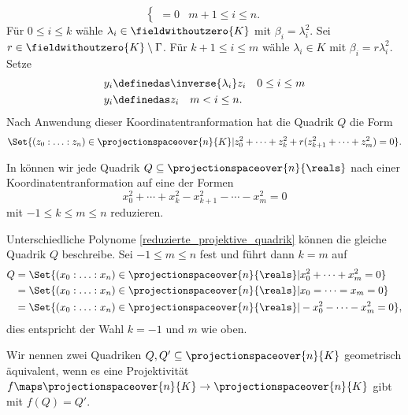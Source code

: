 \begin{beispiel*}
\begin{equation*}
\begin{cases}
      =0 &m+1\leq i\leq n.
    \end{cases}
  \end{equation*}
  Für \( 0\leq i\leq k \) wähle \( \lambda_i\in \fieldwithoutzero{K} \) mit \( \beta_i=\lambda_i^2 \). Sei \( r\in \fieldwithoutzero{K}\setminus \Gamma \). Für \( k+1\leq i\leq m\) wähle \( \lambda_i\in K \) mit \( \beta_i=r\lambda_i^2 \). Setze
  \begin{align*}
    y_i&\definedas \inverse{\lambda_i}z_i\quad 0\leq i\leq m\\
    y_i&\definedas z_i\quad m<i\leq n.
  \end{align*}
  Nach Anwendung dieser Koordinatentranformation hat die Quadrik \( Q \) die Form
  \begin{equation*}
    \Set{(z_0:\dotsc:z_n)\in \projectionspaceover{n}{K}|z_0^2+\dotsb+z_k^2+r(z_{k+1}^2+\dotsb+z_m^2)=0}.
  \end{equation*}
\end{beispiel*}
\begin{bemerkung*}
  In  können wir jede Quadrik \( Q\subseteq \projectionspaceover{n}{\reals} \) nach einer Koordinatentranformation auf eine der Formen
  \begin{equation*}
    \tag{\( * \)}\label{reduzierte_projektive_quadrik}x_0^2+\dotsb+x_k^2-x_{k+1}^2-\dotsb-x_m^2=0
  \end{equation*}
  mit \( -1\leq k\leq m\leq n \) reduzieren.

  Unterschiedliche Polynome \eqref{reduzierte_projektive_quadrik} können die gleiche Quadrik \( Q \) beschreibe. Sei \( -1\leq m\leq n \) fest und \zb führt dann \( k=m \) auf 
  \begin{align*}
    Q&=\Set{(x_0:\dotsc:x_n)\in \projectionspaceover{n}{\reals}|x_0^2+\dotsb+x_m^2=0}\\
    &=\Set{(x_0:\dotsc:x_n)\in \projectionspaceover{n}{\reals}|x_0=\dotsb=x_m=0}\\
    &=\Set{(x_0:\dotsc:x_n)\in\projectionspaceover{n}{\reals}|-x_0^2-\dotsb-x_m^2=0},
  \end{align*}
  dies entspricht der Wahl \( k=-1 \) und \( m \) wie oben.
\end{bemerkung*}
\begin{definition*}
  Wir nennen zwei Quadriken \( Q,Q'\subseteq \projectionspaceover{n}{K} \) geometrisch äquivalent, wenn es eine Projektivität \( f\maps \projectionspaceover{n}{K}\to \projectionspaceover{n}{K} \) gibt mit \( f(Q)=Q' \).
\end{definition*}
